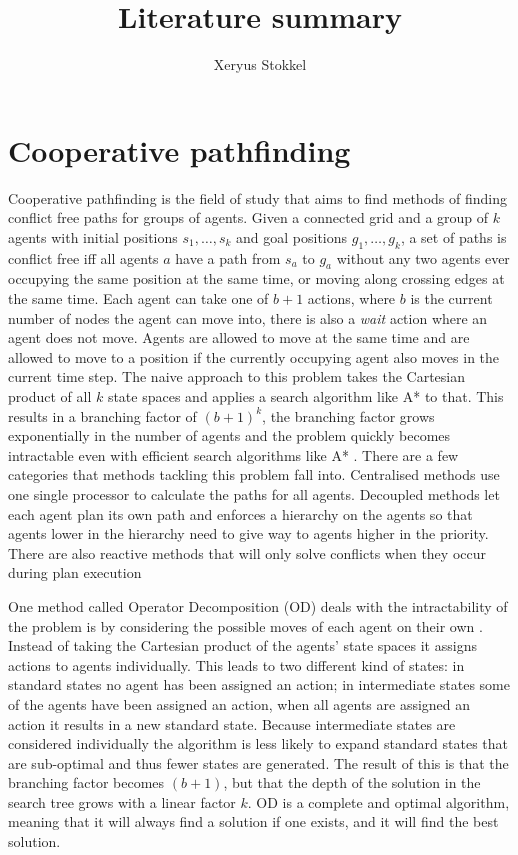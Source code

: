 \documentclass[a4paper]{article}
\title{Literature summary}
\author{Xeryus Stokkel}
\begin{document}
\maketitle

\section{Cooperative pathfinding}
Cooperative pathfinding is the field of study that aims to find methods of
finding conflict free paths for groups of agents. Given a connected grid and a
group of $k$ agents with initial positions $s_1, \ldots, s_k$ and goal
positions $g_1, \ldots, g_k$, a set of paths is conflict free iff all agents
$a$ have a path from $s_a$ to $g_a$ without any two agents ever occupying
the same position at the same time, or moving along crossing edges at the same
time. Each agent can take one of $b+1$ actions, where $b$ is the current number
of nodes the agent can move into, there is also a \textit{wait} action where an
agent does not move. Agents are allowed to move at the same time and are
allowed to move to a position if the currently occupying agent also moves in
the current time step. The naive approach to this problem takes the Cartesian
product of all $k$ state spaces and applies a search algorithm like A* to that.
This results in a branching factor of $(b+1)^k$, the branching factor grows
exponentially in the number of agents and the problem quickly becomes
intractable even with efficient search algorithms like A* \cite{sharon2013}.
There are a few categories that methods tackling this problem fall into.
Centralised methods use one single processor to calculate the paths for all
agents. Decoupled methods let each agent plan its own path and enforces a
hierarchy on the agents so that agents lower in the hierarchy need to give way
to agents higher in the priority. There are also reactive methods that will
only solve conflicts when they occur during plan execution

One method called Operator Decomposition (OD) deals with the intractability of
the problem is by considering the possible moves of each agent on their own
\cite{standley2010,standley2011}. Instead of taking the Cartesian product of
the agents' state spaces it assigns actions to agents individually. This leads
to two different kind of states: in standard states no agent has been assigned
an action; in intermediate states some of the agents have been assigned an
action, when all agents are assigned an action it results in a new standard
state. Because intermediate states are considered individually the algorithm is
less likely to expand standard states that are sub-optimal and thus fewer
states are generated. The result of this is that the branching factor becomes
$(b+1)$, but that the depth of the solution in the search tree grows with a
linear factor $k$. OD is a complete and optimal algorithm, meaning that it will
always find a solution if one exists, and it will find the best solution.
\end{document}
